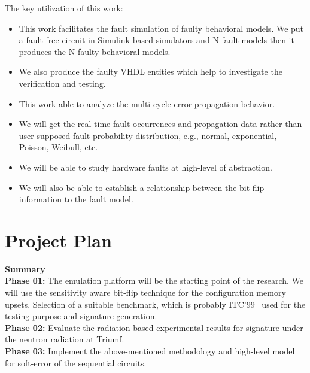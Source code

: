 %
%
The key utilization of this work:
\begin{itemize}
\item This work facilitates the fault simulation of faulty behavioral models. We put a fault-free circuit in Simulink based simulators and N fault models then it produces the N-faulty behavioral models.
\item We also produce the faulty VHDL entities which help to investigate the verification and testing.
\item This work able to analyze the multi-cycle error propagation behavior.
\item We will get the real-time fault occurrences and propagation data rather than user supposed fault probability distribution, e.g., normal, exponential, Poisson, Weibull, etc.
\item We will be able to study hardware faults at high-level of abstraction.
\item We will also be able to establish a relationship between the bit-flip information to the fault model.
\end{itemize}

\section{Project Plan}
\textbf{Summary} \\
\textbf{Phase  01:} The emulation platform will be the starting point of the research. We will use the sensitivity aware bit-flip technique for the configuration memory upsets. Selection of a suitable benchmark, which is probably ITC'99~\citep{ITC} used for the testing purpose and signature generation.\\
\textbf{Phase  02:} Evaluate the radiation-based experimental results for signature under the neutron radiation at Triumf.\\
\textbf{Phase 03:} Implement the above-mentioned methodology and high-level model for soft-error of the sequential circuits.